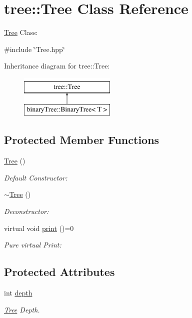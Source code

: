 \hypertarget{classtree_1_1Tree}{\section{tree\-:\-:Tree Class Reference}
\label{classtree_1_1Tree}
}


\hyperlink{classtree_1_1Tree}{Tree} Class\-:  




{\ttfamily \#include \char`\"{}Tree.\-hpp\char`\"{}}

Inheritance diagram for tree\-:\-:Tree\-:\begin{figure}[H]
\begin{center}
\leavevmode
\includegraphics[height=2.000000cm]{classtree_1_1Tree}
\end{center}
\end{figure}
\subsection*{Protected Member Functions}
\begin{DoxyCompactItemize}
\item 
\hyperlink{classtree_1_1Tree_a66755a8dbcf714aa93e63952bdb62484}{Tree} ()
\begin{DoxyCompactList}\small\item\em Default Constructor\-: \end{DoxyCompactList}\item 
\hyperlink{classtree_1_1Tree_af393c36d4a1520937a7d5fcd985d9e08}{$\sim$\-Tree} ()
\begin{DoxyCompactList}\small\item\em Deconstructor\-: \end{DoxyCompactList}\item 
virtual void \hyperlink{classtree_1_1Tree_ae5b70de2d45be21d9b1b272c945b6248}{print} ()=0
\begin{DoxyCompactList}\small\item\em Pure virtual Print\-: \end{DoxyCompactList}\end{DoxyCompactItemize}
\subsection*{Protected Attributes}
\begin{DoxyCompactItemize}
\item 
int \hyperlink{classtree_1_1Tree_ae808b4b4b204faaa40e1e636ebfab8e6}{depth}
\begin{DoxyCompactList}\small\item\em \hyperlink{classtree_1_1Tree}{Tree} Depth. \end{DoxyCompactList}\end{DoxyCompactItemize}


